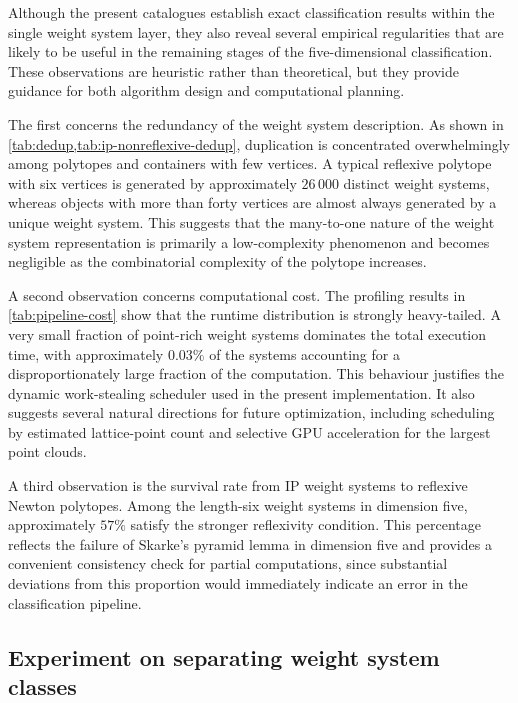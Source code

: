 \documentclass[appliedmath,article,submit,moreauthors]{Definitions/mdpi}
\begin{document}
Although the present catalogues establish exact classification results within
the single weight system layer, they also reveal several empirical regularities
that are likely to be useful in the remaining stages of the five-dimensional
classification. These observations are heuristic rather than theoretical, but
they provide guidance for both algorithm design and computational planning.

The first concerns the redundancy of the weight system description. As shown in
\cref{tab:dedup,tab:ip-nonreflexive-dedup}, duplication is concentrated
overwhelmingly among polytopes and containers with few vertices. A typical
reflexive polytope with six vertices is generated by approximately \(26\,000\)
distinct weight systems, whereas objects with more than forty vertices are
almost always generated by a unique weight system. This suggests that the
many-to-one nature of the weight system representation is primarily a
low-complexity phenomenon and becomes negligible as the combinatorial complexity
of the polytope increases.

A second observation concerns computational cost. The profiling results in
\cref{tab:pipeline-cost} show that the runtime distribution is strongly
heavy-tailed. A very small fraction of point-rich weight systems dominates the
total execution time, with approximately \(0.03\%\) of the systems accounting
for a disproportionately large fraction of the computation. This behaviour
justifies the dynamic work-stealing scheduler used in the present
implementation. It also suggests several natural directions for future
optimization, including scheduling by estimated lattice-point count and
selective GPU acceleration for the largest point clouds.

A third observation is the survival rate from IP weight systems to reflexive
Newton polytopes. Among the length-six weight systems in dimension five,
approximately \(57\%\) satisfy the stronger reflexivity condition. This
percentage reflects the failure of Skarke's pyramid lemma in dimension five and
provides a convenient consistency check for partial computations, since
substantial deviations from this proportion would immediately indicate an error
in the classification pipeline.

\subsection{Experiment on separating weight system classes}
\label{sec:discussion-separation}
\end{document}
